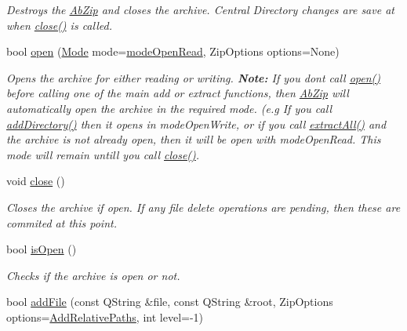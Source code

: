 \begin{DoxyCompactItemize}
\begin{DoxyCompactList}\small\item\em Destroys the \hyperlink{class_ab_zip}{Ab\+Zip} and closes the archive. Central Directory changes are save at when \hyperlink{class_ab_zip_a8a68479ea9a9b4ba18064eb4f011af83}{close()} is called. \end{DoxyCompactList}\item 
bool \hyperlink{class_ab_zip_ab57494eaad3a580c84dd66978e84db0c}{open} (\hyperlink{class_ab_zip_ad24114feac0d38566f6b36f5fc0db54e}{Mode} mode=\hyperlink{class_ab_zip_ad24114feac0d38566f6b36f5fc0db54eab1422ad58f4dcd50cff8ce563ec8a806}{mode\+Open\+Read}, Zip\+Options options=None)
\begin{DoxyCompactList}\small\item\em Opens the archive for either reading or writing. {\bfseries Note\+:} If you don\textquotesingle{}t call \hyperlink{class_ab_zip_ab57494eaad3a580c84dd66978e84db0c}{open()} before calling one of the main add or extract functions, then \hyperlink{class_ab_zip}{Ab\+Zip} will automatically open the archive in the required mode. (e.\+g If you call \hyperlink{class_ab_zip_ae4ad67e2d39ff729f648d12ec89b8ea0}{add\+Directory()} then it opens in mode\+Open\+Write, or if you call \hyperlink{class_ab_zip_ac32a9ad3665fea51a0d3977e251ade73}{extract\+All()} and the archive is not already open, then it will be open with mode\+Open\+Read. This mode will remain untill you call \hyperlink{class_ab_zip_a8a68479ea9a9b4ba18064eb4f011af83}{close()}. \end{DoxyCompactList}\item 
void \hyperlink{class_ab_zip_a8a68479ea9a9b4ba18064eb4f011af83}{close} ()
\begin{DoxyCompactList}\small\item\em Closes the archive if open. If any file delete operations are pending, then these are commited at this point. \end{DoxyCompactList}\item 
bool \hyperlink{class_ab_zip_aaa0b968b507346894fedb53519e40bba}{is\+Open} ()
\begin{DoxyCompactList}\small\item\em Checks if the archive is open or not. \end{DoxyCompactList}\item 
bool \hyperlink{class_ab_zip_a151daf4412c98f40a7608fd825689382}{add\+File} (const Q\+String \&file, const Q\+String \&root, Zip\+Options options=\hyperlink{class_ab_zip_a9c4f57d6b8d9a449c2eb6c4d4e53c9d5a9fe2234f7fddcfdae76f8aeb8c3c2d44}{Add\+Relative\+Paths}, int level=-\/1)

\end{DoxyCompactItemize}
